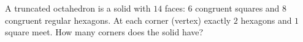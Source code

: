 A truncated octahedron is a solid with $14$ faces: $6$ congruent squares and $8$ congruent regular hexagons. At each corner (vertex) exactly $2$ hexagons and $1$ square meet. How many corners does the solid have?
